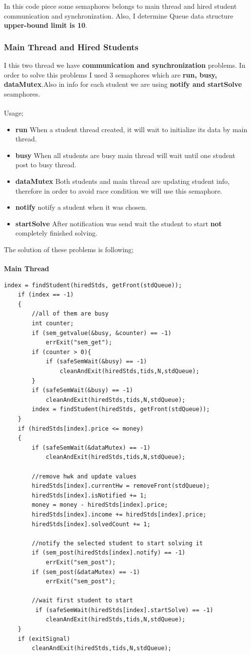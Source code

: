 \documentclass{article}
\begin{document}
In this code piece some semaphores belongs to main thread and hired student communication and synchronization.
Also, I determine Queue data structure \textbf{upper-bound limit is 10}.
\subsubsection*{Main Thread and Hired Students}
I this two thread we have \textbf{communication and synchronization} problems. In order to solve this problems I used 3 semaphores 
which are \textbf{run, busy, dataMutex}.Also in info for each student we are using \textbf{notify and startSolve} seamphores. \\ \\
Usage;
\begin{itemize}
	\item \textbf{run} When a student thread created, it will wait to initialize its data by main thread.
	\item \textbf{busy} When all students are busy main thread will wait until one student post to busy thread.
	\item \textbf{dataMutex} Both students and main thread are updating student info, therefore in order to avoid race
	condition we will use this semaphore.
	\item \textbf{notify} notify a student when it was chosen.
	\item \textbf{startSolve} After notification was send wait the student to start \textbf{not} completely finished solving.
\end{itemize}
The solution of these problems is following;\\ \\
\textbf{Main Thread}
\begin{lstlisting}[style=CStyle]
	index = findStudent(hiredStds, getFront(stdQueue));
	if (index == -1)
	{
		//all of them are busy
		int counter;
		if (sem_getvalue(&busy, &counter) == -1)
			errExit("sem_get");
		if (counter > 0){
			if (safeSemWait(&busy) == -1)
            	cleanAndExit(hiredStds,tids,N,stdQueue);
		}
		if (safeSemWait(&busy) == -1)
        	cleanAndExit(hiredStds,tids,N,stdQueue);
		index = findStudent(hiredStds, getFront(stdQueue));
	}
	if (hiredStds[index].price <= money)
	{
		if (safeSemWait(&dataMutex) == -1)
        	cleanAndExit(hiredStds,tids,N,stdQueue);
			
		//remove hwk and update values  
		hiredStds[index].currentHw = removeFront(stdQueue);
		hiredStds[index].isNotified += 1;
		money = money - hiredStds[index].price;
		hiredStds[index].income += hiredStds[index].price;
		hiredStds[index].solvedCount += 1;
		
		//notify the selected student to start solving it
		if (sem_post(hiredStds[index].notify) == -1)
			errExit("sem_post");
		if (sem_post(&dataMutex) == -1)
			errExit("sem_post");
			
		//wait first student to start
		 if (safeSemWait(hiredStds[index].startSolve) == -1)
         	cleanAndExit(hiredStds,tids,N,stdQueue);
	}
	if (exitSignal)
    	cleanAndExit(hiredStds,tids,N,stdQueue);
\end{lstlisting}
\end{document}
